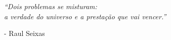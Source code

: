 \begin{epigrafe}
    \thispagestyle{empty}
    \centering
    \textit{``Dois problemas se misturam: \\ a verdade do universo e a presta\c{c}\~{a}o que vai vencer.''}
    \begin{flushright}
       - Raul Seixas
    \end{flushright}
\end{epigrafe}